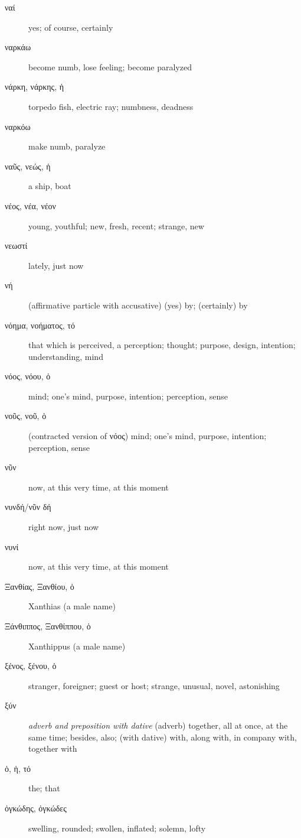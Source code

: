 \documentclass[12pt,letterpaper]{article}
\begin{document}
\begin{description}
    \item[\textgreek{ναί}] \marginnote{*}yes; of course, certainly
    \item[\textgreek{ναρκάω}] become numb, lose feeling; become paralyzed
    \item[\textgreek{νάρκη, νάρκης, ἡ}] torpedo fish, electric ray; numbness, deadness
    \item[\textgreek{ναρκόω}] make numb, paralyze
    \item[\textgreek{ναῦς, νεώς, ἡ}] \marginnote{*}a ship, boat
    \item[\textgreek{νέος, νέα, νέον}] \marginnote{*}young, youthful; new, fresh, recent; strange, new
    \item[\textgreek{νεωστί}] lately, just now
    \item[\textgreek{νή}] (affirmative particle with accusative) (yes) by; (certainly) by
    \item[\textgreek{νόημα, νοήματος, τό}] that which is perceived, a perception; thought; purpose, design, intention; understanding, mind
    \item[\textgreek{νόος, νόου, ὁ}] \marginnote{*}mind; one's mind, purpose, intention; perception, sense
    \item[\textgreek{νοῦς, νοῦ, ὁ}] \marginnote{*}(contracted version of \textgreek{νόος}) mind; one's mind, purpose, intention; perception, sense
    \item[\textgreek{νῦν}] \marginnote{*}now, at this very time, at this moment
    \item[\textgreek{νυνδή/νῦν δή}] right now, just now
    \item[\textgreek{νυνί}] \marginnote{*}now, at this very time, at this moment
    \item[\textgreek{Ξανθίας, Ξανθίου, ὁ}] Xanthias (a male name)
    \item[\textgreek{Ξάνθιππος, Ξανθίππου, ὁ}] Xanthippus (a male name)
    \item[\textgreek{ξένος, ξένου, ὁ}] \marginnote{*}stranger, foreigner; guest or host; strange, unusual, novel, astonishing
    \item[\textgreek{ξύν}] \marginnote{*}\textit{adverb and preposition with dative} (adverb) together, all at once, at the same time; besides, also; (with dative) with, along with, in company with, together with
    \item[\textgreek{ὁ, ἡ, τό}] \marginnote{*}the; that
    \item[\textgreek{ὀγκώδης, ὀγκώδες}] swelling, rounded; swollen, inflated; solemn, lofty

\end{description}
\end{document}
